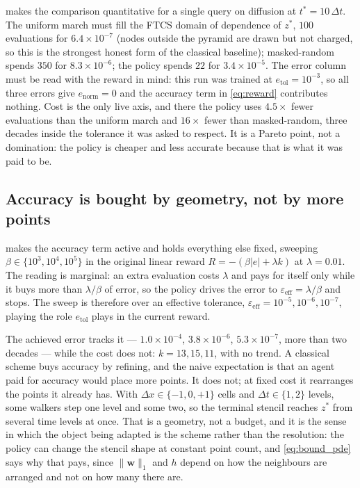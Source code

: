  makes the comparison quantitative for a single query on
diffusion at $t^{*}=10\,\Delta t$. The uniform march must fill the FTCS domain of
dependence of $z^{*}$, $100$ evaluations for $6.4\times10^{-7}$ (nodes outside
the pyramid are drawn but not charged, so this is the strongest honest form of
the classical baseline); masked-random spends $350$ for $8.3\times10^{-6}$; the
policy spends $22$ for $3.4\times10^{-5}$. The error column must be read with the
reward in mind: this run was trained at $e_{\mathrm{tol}}=10^{-3}$, so all three
errors give $e_{\mathrm{norm}}=0$ and the accuracy term in \eqref{eq:reward}
contributes nothing. Cost is the only live axis, and there the policy uses
$4.5\times$ fewer evaluations than the uniform march and $16\times$ fewer than
masked-random, three decades inside the tolerance it was asked to respect. It is
a Pareto point, not a domination: the policy is cheaper and less accurate because
that is what it was paid to be.


\subsection{Accuracy is bought by geometry, not by more points}
\label{sec:results_beta}

 makes the accuracy term active and holds everything else
fixed, sweeping $\beta \in \{10^{3},10^{4},10^{5}\}$ in the original linear
reward $R=-(\beta|e|+\lambda k)$ at $\lambda=0.01$. The reading is marginal: an
extra evaluation costs $\lambda$ and pays for itself only while it buys more than
$\lambda/\beta$ of error, so the policy drives the error to
$\varepsilon_{\mathrm{eff}}=\lambda/\beta$ and stops. The sweep is therefore over
an effective tolerance, $\varepsilon_{\mathrm{eff}}=10^{-5},10^{-6},10^{-7}$,
playing the role $e_{\mathrm{tol}}$ plays in the current reward.

The achieved error tracks it --- $1.0\times10^{-4}$, $3.8\times10^{-6}$,
$5.3\times10^{-7}$, more than two decades --- while the cost does not:
$k=13,15,11$, with no trend. A classical scheme buys accuracy by refining, and
the naive expectation is that an agent paid for accuracy would place more points.
It does not; at fixed cost it rearranges the points it already has. With
$\Delta x \in \{-1,0,+1\}$ cells and $\Delta t \in \{1,2\}$ levels, some walkers
step one level and some two, so the terminal stencil reaches $z^{*}$ from several
time levels at once. That is a geometry, not a budget, and it is the sense in
which the object being adapted is the scheme rather than the resolution: the
policy can change the stencil shape at constant point count, and
\eqref{eq:bound_pde} says why that pays, since $\|\mathbf{w}\|_1$ and $h$ depend
on how the neighbours are arranged and not on how many there are.


